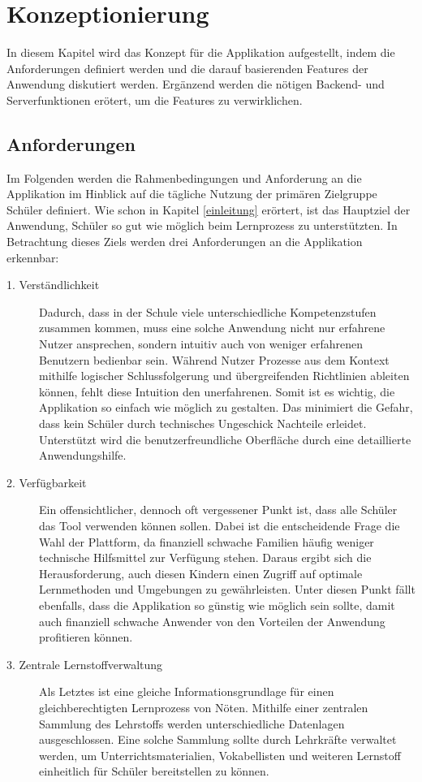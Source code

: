 \chapter{Konzeptionierung}
In diesem Kapitel wird das Konzept für die Applikation aufgestellt, indem die Anforderungen definiert werden und die darauf basierenden Features der Anwendung diskutiert werden. Ergänzend werden die nötigen Backend- und Serverfunktionen erötert, um die Features zu verwirklichen.
\section{Anforderungen}
\label{section:rahmenbedingungen}
Im Folgenden werden die Rahmenbedingungen und Anforderung an die Applikation im Hinblick auf die tägliche Nutzung der primären Zielgruppe Schüler definiert. Wie schon in Kapitel \ref{einleitung} erörtert, ist das Hauptziel der Anwendung, Schüler so gut wie möglich beim Lernprozess zu unterstützten. In Betrachtung dieses Ziels werden drei Anforderungen an die Applikation erkennbar:
\begin{description}
\item[1. Verständlichkeit]
Dadurch, dass in der Schule viele unterschiedliche Kompetenzstufen zusammen kommen, muss eine solche Anwendung nicht nur erfahrene Nutzer ansprechen, sondern intuitiv auch von weniger erfahrenen Benutzern bedienbar sein. Während Nutzer Prozesse aus dem Kontext mithilfe logischer Schlussfolgerung und übergreifenden Richtlinien ableiten können, fehlt diese Intuition den unerfahrenen. Somit ist es wichtig, die Applikation so einfach wie möglich zu gestalten. Das minimiert die Gefahr, dass kein Schüler durch technisches Ungeschick Nachteile erleidet. Unterstützt wird die benutzerfreundliche Oberfläche durch eine detaillierte Anwendungshilfe.
\item[2. Verfügbarkeit]
Ein offensichtlicher, dennoch oft vergessener Punkt ist, dass alle Schüler das Tool verwenden können sollen. Dabei ist die entscheidende Frage die Wahl der Plattform, da finanziell schwache Familien häufig weniger technische Hilfsmittel zur Verfügung stehen. Daraus ergibt sich die Herausforderung, auch diesen Kindern einen Zugriff auf optimale Lernmethoden und Umgebungen zu gewährleisten. Unter diesen Punkt fällt ebenfalls, dass die Applikation so günstig wie möglich sein sollte, damit auch finanziell schwache Anwender von den Vorteilen der Anwendung profitieren können.
\item[3. Zentrale Lernstoffverwaltung]
Als Letztes ist eine gleiche Informationsgrundlage für einen gleichberechtigten Lernprozess von Nöten. Mithilfe einer zentralen Sammlung des Lehrstoffs werden unterschiedliche Datenlagen ausgeschlossen. Eine solche Sammlung sollte durch Lehrkräfte verwaltet werden, um Unterrichtsmaterialien, Vokabellisten und weiteren Lernstoff einheitlich für Schüler bereitstellen zu können.
\end{description}

